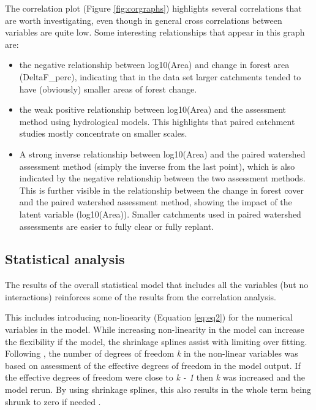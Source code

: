 \documentclass[]{elsarticle} %
\providecommand{\tightlist}{%
  \setlength{\itemsep}{0pt}\setlength{\parskip}{0pt}}
\begin{document}
The correlation plot (Figure \ref{fig:corgraphs}) highlights several correlations that are worth investigating, even though in general cross correlations between variables are quite low. Some interesting relationships that appear in this graph are:

\begin{itemize}
\tightlist
\item
  the negative relationship between log10(Area) and change in forest area (DeltaF\_perc), indicating that in the data set larger catchments tended to have (obviously) smaller areas of forest change.
\item
  the weak positive relationship between log10(Area) and the assessment method using hydrological models. This highlights that paired catchment studies mostly concentrate on smaller scales.
\item
  A strong inverse relationship between log10(Area) and the paired watershed assessment method (simply the inverse from the last point), which is also indicated by the negative relationship between the two assessment methods. This is further visible in the relationship between the change in forest cover and the paired watershed assessment method, showing the impact of the latent variable (log10(Area)). Smaller catchments used in paired watershed assessments are easier to fully clear or fully replant.
\end{itemize}

\hypertarget{statistical-analysis}{%
\subsection{Statistical analysis}\label{statistical-analysis}}

The results of the overall statistical model that includes all the variables (but no interactions) reinforces some of the results from the correlation analysis.

This includes introducing non-linearity (Equation \eqref{eq:eq2}) for the numerical variables in the model. While increasing non-linearity in the model can increase the flexibility if the model, the shrinkage splines assist with limiting over fitting. Following \citet{wood2006}, the number of degrees of freedom \emph{k} in the non-linear variables was based on assessment of the effective degrees of freedom in the model output. If the effective degrees of freedom were close to \emph{k - 1} then \emph{k} was increased and the model rerun. By using shrinkage splines, this also results in the whole term being shrunk to zero if needed \citep{wood2006}.
\end{document}
